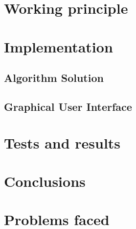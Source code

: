 \documentclass[10pt,twocolumn]{article}
\begin{document}
\section{Working principle}

\section{Implementation}


\subsection{Algorithm Solution}


\subsection{Graphical User Interface}





\section{Tests and results}

\section{Conclusions}

\section{Problems faced}


\clearpage
\end{document}
